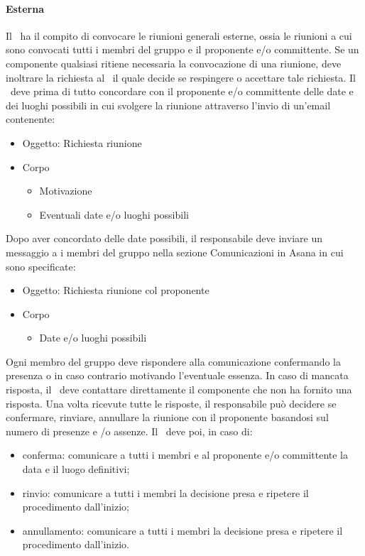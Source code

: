 \documentclass[../NormeDiProgetto.tex]{subfiles}
\begin{document}
				\paragraph{Esterna\\}
				Il \responsabilediprogetto\ ha il compito di convocare le riunioni generali esterne, ossia
				le riunioni a cui sono convocati tutti i membri del gruppo e il proponente e/o committente.
				Se un componente qualsiasi ritiene necessaria la convocazione di una riunione, deve
				inoltrare la richiesta al \responsabilediprogetto\ il quale decide se respingere o accettare
				tale richiesta.
				Il \responsabilediprogetto\ deve prima di tutto concordare con il proponente e/o committente delle date e dei luoghi
				possibili in cui svolgere la riunione attraverso l'invio di un'email contenente:
				\begin{itemize}
					\item Oggetto: Richiesta riunione
					\item Corpo
					\begin{itemize}
						\item Motivazione
						\item Eventuali date e/o luoghi possibili
					\end{itemize}
				\end{itemize}
				Dopo aver concordato delle date possibili, il responsabile deve inviare un messaggio a
				i membri del gruppo nella sezione Comunicazioni in Asana in cui sono specificate:
				\begin{itemize}
					\item Oggetto: Richiesta riunione col proponente
					\item Corpo
					\begin{itemize}
						\item Date e/o luoghi possibili
					\end{itemize}
				\end{itemize}
				Ogni membro del gruppo deve rispondere alla comunicazione confermando la presenza o in caso contrario motivando l'eventuale essenza. In caso di mancata risposta, il \responsabilediprogetto\ deve contattare direttamente il componente che non ha fornito una risposta. Una volta ricevute tutte le risposte, il responsabile può decidere se confermare, rinviare, annullare la riunione con il proponente basandosi sul numero di presenze e /o assenze.
				Il \responsabilediprogetto\ deve poi, in caso di:
				\begin{itemize}
					\item conferma: comunicare a tutti i membri e al proponente e/o committente la data e il luogo definitivi;
					\item rinvio: comunicare a tutti i membri la decisione presa e ripetere il procedimento dall'inizio;
					\item annullamento: comunicare a tutti i membri la decisione presa e ripetere il procedimento dall'inizio.
				\end{itemize}
\end{document}
